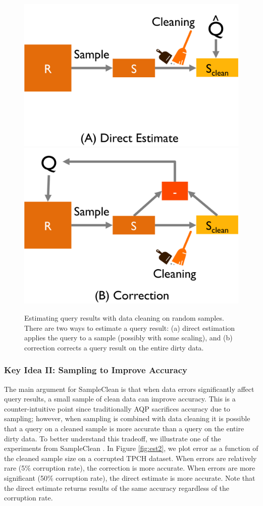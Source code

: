\begin{figure}\centering
\includegraphics[width=.3\columnwidth]{figs/est1b.png}
\hspace{2em}
\includegraphics[width=.3\columnwidth]{figs/est1c.png}
\caption{Estimating query results with data cleaning on random samples. There are two ways to estimate a query result: (a) direct estimation applies the query to a sample (possibly with some scaling), and (b) correction corrects a query result on the entire dirty data.\label{fig:est}}
\end{figure}

\subsubsection{Key Idea II: Sampling to Improve Accuracy}
The main argument for SampleClean is that when data errors significantly affect query results, a small sample of clean data can improve accuracy.
This is a counter-intuitive point since traditionally AQP sacrifices accuracy due to sampling; however, when sampling is combined with data cleaning it is possible that a query on a cleaned sample is more accurate than a query on the entire dirty data.
To better understand this tradeoff, we illustrate one of the experiments from SampleClean \cite{wang1999sample}.
In Figure \ref{fig:est2}, we plot error as a function of the cleaned sample size on a corrupted TPCH dataset.
When errors are relatively rare (5\% corruption rate), the correction is more accurate. 
When errors are more significant (50\% corruption rate), the direct estimate is more accurate.
Note that the direct estimate returns results of the same accuracy regardless of the corruption rate. 



